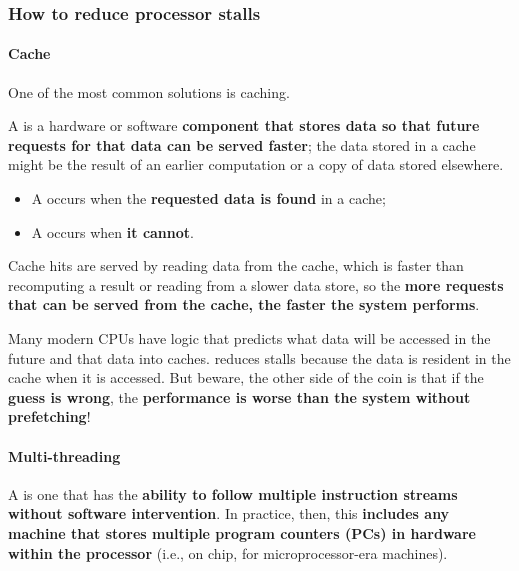 \newpage

\subsubsection{How to reduce processor stalls}

\paragraph{Cache}

One of the most common solutions is caching.

\highspace
A  is a hardware or software \textbf{component that stores data so that future requests for that data can be served faster}; the data stored in a cache might be the result of an earlier computation or a copy of data stored elsewhere.
\begin{itemize}
    \item A  occurs when the \textbf{requested data is found} in a cache;
    \item A  occurs when \textbf{it cannot}.
\end{itemize}
Cache hits are served by reading data from the cache, which is faster than recomputing a result or reading from a slower data store, so the \textbf{more requests that can be served from the cache, the faster the system performs}.\cite{wikipediaCacheResearch}

\highspace
Many modern CPUs have logic that predicts what data will be accessed in the future and  that data into caches.  reduces stalls because the data is resident in the cache when it is accessed. But beware, the other side of the coin is that if the \textbf{guess is wrong}, the \textbf{performance is worse than the system without prefetching}!

\longline

\paragraph{Multi-threading}

A  is one that has the \textbf{ability to follow multiple instruction streams without software intervention}. In practice, then, this \textbf{includes any machine that stores multiple program counters (PCs) in hardware within the processor} (i.e., on chip, for microprocessor-era machines).\cite{nemirovsky2022multithreading}

